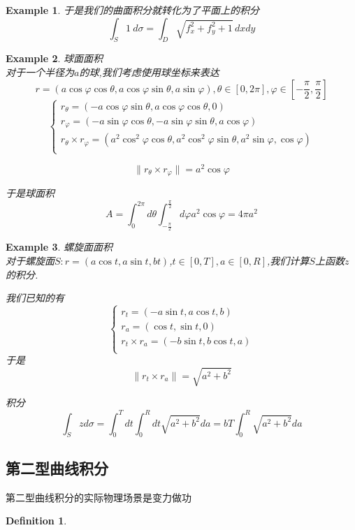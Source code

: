 \documentclass[11pt,hyperref,a4paper,UTF8]{ctexart}
\newtheorem{example}{Example}[subsection]
\newtheorem{definition}{Definition}[subsection]
\newcommand{\bracket}[1]{\left[#1\right]}
\begin{document}
\begin{CJK}{UTF8}{gkai}
\begin{example}
  于是我们的曲面积分就转化为了平面上的积分
  \[\int_S 1 ~ d\sigma = \int_{D} \sqrt{f_x^2 + f_y^2 + 1} \, dx dy\]
\end{example}

\begin{example}
  球面面积\\
  
  对于一个半径为$a$的球,我们考虑使用球坐标来表达
  \[r = (a \cos \varphi\cos \theta,a\cos \varphi \sin \theta,a \sin \varphi), \theta \in [0,2\pi], \varphi \in \bracket{-\frac{\pi}{2},\frac{\pi}{2}}\]
  \[\begin{cases}
    r_\theta = (-a \cos\varphi \sin \theta,a \cos \varphi\cos \theta,0)\\
    r_\varphi = (-a\sin \varphi \cos \theta,-a \sin \varphi\sin \theta,a \cos \varphi)\\
    r_\theta \times r_\varphi = (a^2 \cos^2 \varphi\cos \theta,a^2 \cos^2\varphi \sin \theta,a^2 \sin \varphi,\cos\varphi)\\
  \end{cases}\]

  \[\|r_\theta \times r_\varphi\| = a^2 \cos \varphi\]

  于是球面积
  \[A = \int_{0}^{2\pi} d\theta \int_{-\frac{\pi}{2}}^{\frac{\pi}{2}} d\varphi a^2 \cos\varphi = 4 \pi a^2\]
\end{example}

\begin{example}
  螺旋面面积\\

  对于螺旋面$S : r = (a\cos t,a\sin t,bt)$,$t \in [0,T], a \in [0,R]$,我们计算$S$上函数$z$的积分.

  我们已知的有
  \[\begin{cases}
    r_t = (-a \sin t,a\cos t,b)\\
    r_a = (\cos t, \sin t,0)\\
    r_t \times r_a = (-b \sin t,b\cos t,a)\\
  \end{cases}\]
  于是
  \[\|r_t\times r_a \| = \sqrt{a^2 + b^2}\]

  积分
  \[\int_{S} z d\sigma = \int_{0}^{T}dt \int_{0}^{R} d t \sqrt{a^2 + b^2} da =bT \int_{0}^{R} \sqrt{a^2 + b^2} da\]
\end{example}

\subsection{第二型曲线积分}
第二型曲线积分的实际物理场景是变力做功
\begin{definition}
  

\end{definition}
\end{CJK}
\end{document}
